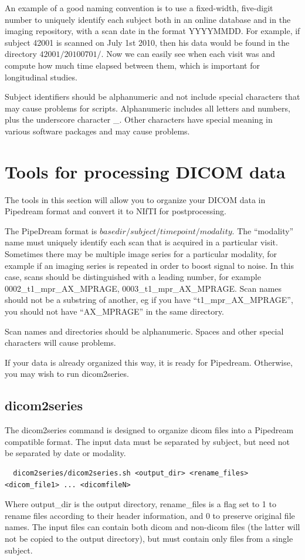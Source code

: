 \documentclass{InsightArticle}
\begin{document}
An example of a good naming convention is to use a fixed-width, five-digit number to uniquely identify each subject both in an online database and in the imaging repository, with a scan date in the format YYYYMMDD. For example, if subject 42001 is scanned on July 1st 2010, then his data would be found in the directory $42001/20100701/$. Now we can easily see when each visit was and compute how much time elapsed between them, which is important for longitudinal studies. 

Subject identifiers should be alphanumeric and not include special characters that may cause problems for scripts. Alphanumeric includes all letters and numbers, plus the underscore character \_. Other characters have special meaning in various software packages and may cause problems. 

\section{Tools for processing DICOM data}

The tools in this section will allow you to organize your DICOM data in Pipedream format and convert it to NIfTI for postprocessing.

The PipeDream format is $basedir/subject/timepoint/modality$.  The ``modality''  name must uniquely identify each scan that is acquired in a particular visit. Sometimes there may be multiple image series for a particular modality, for example if an imaging series is repeated in order to boost signal to noise. In this case, scans should be distinguished with a leading number, for example 0002\_t1\_mpr\_AX\_MPRAGE, 0003\_t1\_mpr\_AX\_MPRAGE. Scan names should not be a substring of another, eg if you have ``t1\_mpr\_AX\_MPRAGE'', you should not have ``AX\_MPRAGE'' in the same directory.

Scan names and directories should be alphanumeric. Spaces and other special characters will cause problems.

If your data is already organized this way, it is ready for Pipedream. Otherwise, you may wish to run dicom2series.
 

\subsection{dicom2series}

The dicom2series command is designed to organize dicom files into a Pipedream compatible format. The input data must be separated by subject, but need not be separated by date or modality. 
\begin{verbatim}
  dicom2series/dicom2series.sh <output_dir> <rename_files> <dicom_file1> ... <dicomfileN>
\end{verbatim}
Where output\_dir is the output directory, rename\_files is a flag set to 1 to rename files according to their header information, and 0 to preserve original file names. The input files can contain both dicom and non-dicom files (the latter will not be copied to the output directory), but must contain only files from a single subject. 
\end{document}
